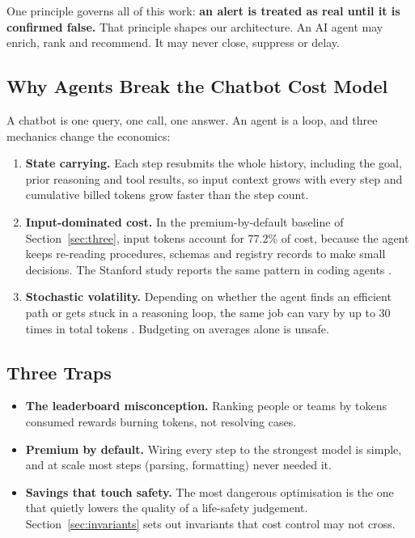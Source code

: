 \documentclass[conference]{IEEEtran}
\begin{document}
One principle governs all of this work: \textbf{an alert is treated as real until it is confirmed false.} That principle shapes our architecture. An AI agent may enrich, rank and recommend. It may never close, suppress or delay.

\subsection{Why Agents Break the Chatbot Cost Model}
\label{sec:agents}

A chatbot is one query, one call, one answer. An agent is a loop, and three mechanics change the economics:
\begin{enumerate}
\item \textbf{State carrying.} Each step resubmits the whole history, including the goal, prior reasoning and tool results, so input context grows with every step and cumulative billed tokens grow faster than the step count.
\item \textbf{Input-dominated cost.} In the premium-by-default baseline of Section~\ref{sec:three}, input tokens account for 77.2\% of cost, because the agent keeps re-reading procedures, schemas and registry records to make small decisions. The Stanford study reports the same pattern in coding agents \cite{bai}.
\item \textbf{Stochastic volatility.} Depending on whether the agent finds an efficient path or gets stuck in a reasoning loop, the same job can vary by up to 30 times in total tokens \cite{bai}. Budgeting on averages alone is unsafe.
\end{enumerate}

\subsection{Three Traps}

\begin{itemize}
\item \textbf{The leaderboard misconception.} Ranking people or teams by tokens consumed rewards burning tokens, not resolving cases.
\item \textbf{Premium by default.} Wiring every step to the strongest model is simple, and at scale most steps (parsing, formatting) never needed it.
\item \textbf{Savings that touch safety.} The most dangerous optimisation is the one that quietly lowers the quality of a life-safety judgement. Section~\ref{sec:invariants} sets out invariants that cost control may not cross.
\end{itemize}
\end{document}
